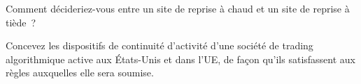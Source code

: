 \begin{interviewq}\label{iq:nw:disaster-recovery-and-regulatory-requirements:5}
Comment décideriez-vous entre un site de reprise à chaud et un site de reprise à tiède~?
\end{interviewq}

\begin{interviewq}\label{iq:nw:disaster-recovery-and-regulatory-requirements:6}
Concevez les dispositifs de continuité d'activité d'une société de trading algorithmique active aux États-Unis et dans l'UE, de façon
qu'ils satisfassent aux règles auxquelles elle sera soumise.
\end{interviewq}
